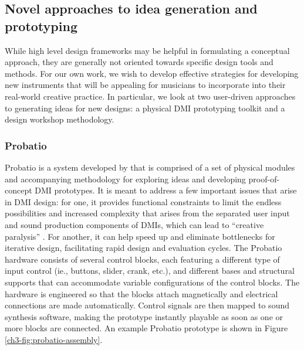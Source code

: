 \documentclass[letterpaper, 12pt]{article}
\begin{document}
\subsection{Novel approaches to idea generation and prototyping}
\label{ch3-sec:novel-approaches-to-idea-generation-and-prototyping}

While high level design frameworks may be helpful in formulating a conceptual approach, they are generally not oriented towards specific design tools and methods. For our own work, we wish to develop effective strategies for developing new instruments that will be appealing for musicians to incorporate into their real-world creative practice. In particular, we look at two user-driven approaches to generating ideas for new designs: a physical DMI prototyping toolkit and a design workshop methodology. 

\subsubsection{Probatio}
\label{ch3-sec:probatio}

Probatio is a system developed by \citet{Calegario2019} that is comprised of a set of physical modules and accompanying methodology for exploring ideas and developing proof-of-concept DMI prototypes. It is meant to address a few important issues that arise in DMI design: for one, it provides functional constraints to limit the endless possibilities and increased complexity that arises from the separated user input and sound production components of DMIs, which can lead to ``creative paralysis'' \citep{Magnusson2010}. For another, it can help speed up and eliminate bottlenecks for iterative design, facilitating rapid design and evaluation cycles. The Probatio hardware consists of several control blocks, each featuring a different type of input control (ie., buttons, slider, crank, etc.), and different bases and structural supports that can accommodate variable configurations of the control blocks. The hardware is engineered so that the blocks attach magnetically and electrical connections are made automatically. Control signals are then mapped to sound synthesis software, making the prototype instantly playable as soon as one or more blocks are connected. An example Probatio prototype is shown in Figure \ref{ch3-fig:probatio-assembly}.
\end{document}
